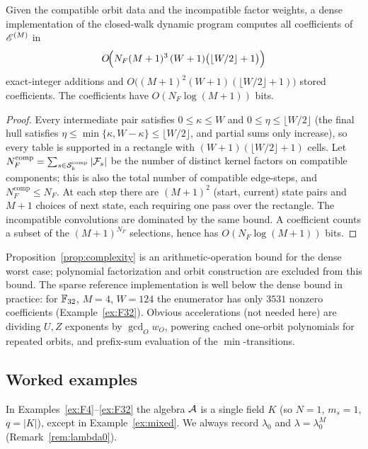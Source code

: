 \begin{proposition}\label{prop:complexity}
Given the compatible orbit data and the incompatible factor weights, a dense implementation of the closed-walk dynamic
program computes all coefficients of $\mathscr E^{(M)}$ in
\[
O\!\Bigl(N_F(M+1)^3\,(W+1)\bigl(\lfloor W/2\rfloor+1\bigr)\Bigr)
\]
exact-integer additions and
$O\!\bigl((M+1)^2(W+1)(\lfloor W/2\rfloor+1)\bigr)$ stored coefficients.
The coefficients have $O(N_F\log(M+1))$ bits.
\end{proposition}

\begin{proof}
Every intermediate pair satisfies $0\leq\kappa\leq W$ and
$0\leq\eta\leq\lfloor W/2\rfloor$ (the final hull satisfies
$\eta\leq\min\{\kappa,W-\kappa\}\leq\lfloor W/2\rfloor$, and partial sums only
increase),
so every table is supported in a rectangle with
$(W+1)(\lfloor W/2\rfloor+1)$ cells.  Let
$N_F^{\mathrm{comp}}=\sum_{s\in\mathcal{S}_k^{\mathrm{comp}}}|\mathcal F_s|$ be the
number of distinct kernel factors on compatible components; this is also the
total number of compatible edge-steps, and $N_F^{\mathrm{comp}}\leq N_F$.
At each step there are $(M+1)^2$
(start, current) state pairs and $M+1$ choices of next state, each requiring
one pass over the rectangle.  The incompatible convolutions are dominated by
the same bound.  A coefficient counts a subset of the $(M+1)^{N_F}$
selections, hence has $O(N_F\log(M+1))$ bits.
\end{proof}

Proposition~\ref{prop:complexity} is an arithmetic-operation bound for the
dense worst case; polynomial factorization and orbit construction are
excluded from this bound.  The sparse reference
implementation is well below the dense bound in practice: for
$\mathbb F_{32}$, $M=4$, $W=124$ the enumerator has only $3531$ nonzero coefficients
(Example~\ref{ex:F32}).  Obvious accelerations (not needed here) are dividing
$U,Z$ exponents by $\gcd_O w_O$, powering cached one-orbit polynomials for
repeated orbits, and prefix-sum evaluation of the $\min$-transitions.

\subsection{Worked examples}\label{sec:worked}

In Examples~\ref{ex:F4}--\ref{ex:F32} the algebra $\mathcal A$ is a single field $K$
(so $N=1$, $m_s=1$, $q=|K|$), except in Example~\ref{ex:mixed}.  We always
record $\lambda_0$ and $\lambda=\lambda_0^M$
(Remark~\ref{rem:lambda0}).

